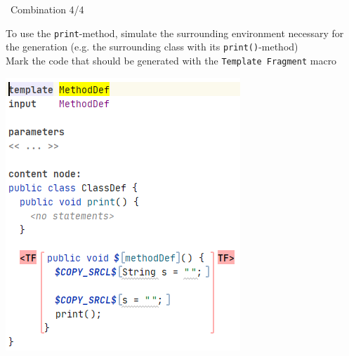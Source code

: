 	\begin{frame}{\workshoptemplate\ Combination 4/4}
	\begin{minipage}{0.52\textwidth}
		To use the \texttt{print}-method, simulate the surrounding environment necessary for the generation (e.g. the surrounding class with its \texttt{print()}-method)\\
		
		Mark the code that should be generated with the \texttt{Template Fragment} macro
	\end{minipage}
	\begin{minipage}{0.4\textwidth}
		\includegraphics[height=0.8\textheight]{illustrations/methodDefGen2.png}
	\end{minipage}
	\end{frame}

